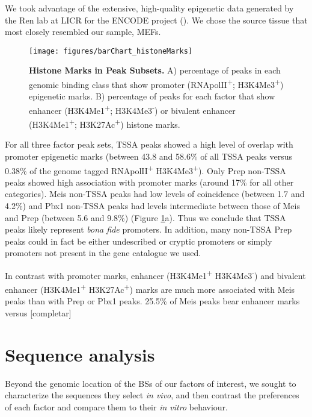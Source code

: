 We took advantage of the extensive, high-quality epigenetic data generated by the Ren lab at LICR for the ENCODE project (\cite{Shen2012}). We chose the source tissue that most closely resembled our sample, \acp{MEF}. 

\begin{figure}[]
  \centering
  \texttt{[image: figures/barChart\_histoneMarks]}
  \caption[Histone Marks in Peak Subsets]{\textbf{Histone Marks in Peak Subsets.} A) percentage of peaks in each genomic binding class that show promoter (RNApolII\textsuperscript{+}; H3K4Me3\textsuperscript{+}) epigenetic marks. B) percentage of peaks for each factor that show enhancer (H3K4Me1\textsuperscript{+}; H3K4Me3\textsuperscript{-}) or bivalent enhancer (H3K4Me1\textsuperscript{+}; H3K27Ac\textsuperscript{+}) histone marks.}
  \label{fig:histoneMarks}
\end{figure}

For all three factor peak sets, \ac{TSSA} peaks showed a high level of overlap with promoter epigenetic marks (between 43.8 and 58.6\% of all \ac{TSSA} peaks versus 0.38\% of the genome tagged RNApolII\textsuperscript{+} H3K4Me3\textsuperscript{+}). Only Prep non-\ac{TSSA} peaks showed high association with promoter marks (around 17\% for all other categories). Meis non-\ac{TSSA} peaks had low levels of coincidence (between 1.7 and 4.2\%) and Pbx1 non-\ac{TSSA} peaks had levels intermediate between those of Meis and Prep (between 5.6 and 9.8\%) (Figure \ref{fig:histoneMarks}a). Thus we conclude that \ac{TSSA} peaks likely represent \textit{bona fide} promoters. In addition, many non-\ac{TSSA} Prep peaks could in fact be either undescribed or cryptic promoters or simply promoters not present in the gene catalogue we used.

In contrast with promoter marks, enhancer (H3K4Me1\textsuperscript{+} H3K4Me3\textsuperscript{-}) and bivalent enhancer (H3K4Me1\textsuperscript{+} H3K27Ac\textsuperscript{+}) marks are much more associated with Meis peaks than with Prep or Pbx1 peaks. 25.5\% of Meis peaks bear enhancer marks versus [completar]
 
\section{Sequence analysis}

Beyond the genomic location of the \acp{BS} of our factors of interest, we sought to characterize the sequences they select \textit{in vivo}, and then contrast the preferences of each factor and compare them to their \textit{in vitro} behaviour. 

